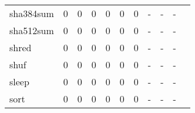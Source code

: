 \begin{longtable}{lp{1.2cm}p{1.2cm}p{1.2cm}p{1.2cm}p{1.2cm}p{1.2cm}p{1.2cm}p{1.2cm}p{1.2cm}p{1.2cm}}
sha384sum &                                     0 &                                                  0 &                                                  0 &                                                  0 &                                                  0 &                                                  0 &                                                  - &                                                  - &                                                  - \\
sha512sum &                                     0 &                                                  0 &                                                  0 &                                                  0 &                                                  0 &                                                  0 &                                                  - &                                                  - &                                                  - \\
shred     &                                     0 &                                                  0 &                                                  0 &                                                  0 &                                                  0 &                                                  0 &                                                  - &                                                  - &                                                  - \\
shuf      &                                     0 &                                                  0 &                                                  0 &                                                  0 &                                                  0 &                                                  0 &                                                  - &                                                  - &                                                  - \\
sleep     &                                     0 &                                                  0 &                                                  0 &                                                  0 &                                                  0 &                                                  0 &                                                  - &                                                  - &                                                  - \\
sort      &                                     0 &                                                  0 &                                                  0 &                                                  0 &                                                  0 &                                                  0 &                                                  - &                                                  - &                                                  - \\

\end{longtable}
